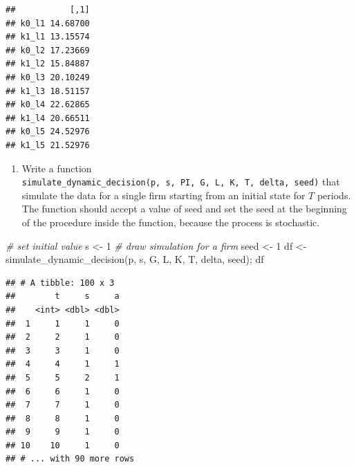 \documentclass[
]{book}
\newenvironment{Shaded}{\begin{snugshade}}{\end{snugshade}}
\newcommand{\CommentTok}[1]{\textcolor[rgb]{0.56,0.35,0.01}{\textit{#1}}}
\newcommand{\DecValTok}[1]{\textcolor[rgb]{0.00,0.00,0.81}{#1}}
\newcommand{\FunctionTok}[1]{\textcolor[rgb]{0.00,0.00,0.00}{#1}}
\newcommand{\NormalTok}[1]{#1}
\newcommand{\OtherTok}[1]{\textcolor[rgb]{0.56,0.35,0.01}{#1}}
\newcommand{\SpecialCharTok}[1]{\textcolor[rgb]{0.00,0.00,0.00}{#1}}
\providecommand{\tightlist}{%
  \setlength{\itemsep}{0pt}\setlength{\parskip}{0pt}}
\begin{document}
\begin{Shaded}
\end{Shaded}

\begin{verbatim}
##           [,1]
## k0_l1 14.68700
## k1_l1 13.15574
## k0_l2 17.23669
## k1_l2 15.84887
## k0_l3 20.10249
## k1_l3 18.51157
## k0_l4 22.62865
## k1_l4 20.66511
## k0_l5 24.52976
## k1_l5 21.52976
\end{verbatim}

\begin{enumerate}
\def\labelenumi{\arabic{enumi}.}
\setcounter{enumi}{5}
\tightlist
\item
  Write a function \texttt{simulate\_dynamic\_decision(p,\ s,\ PI,\ G,\ L,\ K,\ T,\ delta,\ seed)} that simulate the data for a single firm starting from an initial state for \(T\) periods. The function should accept a value of seed and set the seed at the beginning of the procedure inside the function, because the process is stochastic.
\end{enumerate}

\begin{Shaded}
\begin{Highlighting}[]
\CommentTok{\# set initial value}
\NormalTok{s }\OtherTok{\textless{}{-}} \DecValTok{1}
\CommentTok{\# draw simulation for a firm}
\NormalTok{seed }\OtherTok{\textless{}{-}} \DecValTok{1}
\NormalTok{df }\OtherTok{\textless{}{-}} \FunctionTok{simulate\_dynamic\_decision}\NormalTok{(p, s, G, L, K, T, delta, seed); df}
\end{Highlighting}
\end{Shaded}

\begin{verbatim}
## # A tibble: 100 x 3
##        t     s     a
##    <int> <dbl> <dbl>
##  1     1     1     0
##  2     2     1     0
##  3     3     1     0
##  4     4     1     1
##  5     5     2     1
##  6     6     1     0
##  7     7     1     0
##  8     8     1     0
##  9     9     1     0
## 10    10     1     0
## # ... with 90 more rows
\end{verbatim}
\end{document}

